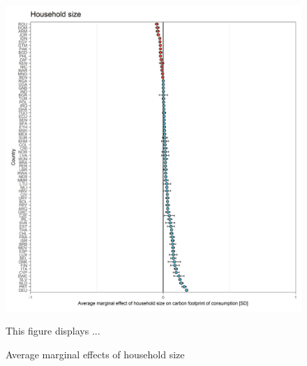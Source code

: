\documentclass[12pt, a4paper]{article}
\newenvironment{subcaption}
{\strut
\vspace{-5pt}
\begin{minipage}[b]{0.9\textwidth}
  \hspace*{-\parindent}
  \footnotesize}
 {\end{minipage}}
\begin{document}
\begin{figure}[ht!]
  \centering
 \caption{Average marginal effects of household size} \label{fig:D3_Size}
  \includegraphics{Analysis_OLS_ME_Carbon_Footprint/AME_OLS_FP_hh_size}
  \begin{subcaption}
    This figure displays ...
  \end{subcaption}

\end{figure}

\clearpage
\end{document}
